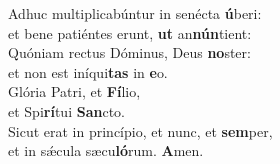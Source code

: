 \evenverse Adhuc multiplicabúntur in senécta \textbf{ú}beri:~\*\\
\evenverse et bene patiéntes erunt, \textbf{ut} an\textbf{nún}tient:\\
\oddverse Quóniam rectus Dóminus, Deus \textbf{no}ster:~\*\\
\oddverse et non est iníqui\textbf{tas} in \textbf{e}o.\\
\evenverse Glória Patri, et \textbf{Fí}lio,~\*\\
\evenverse et Spi\textbf{rí}tui \textbf{San}cto.\\
\oddverse Sicut erat in princípio, et nunc, et \textbf{sem}per,~\*\\
\oddverse et in sǽcula sæcu\textbf{ló}rum. \textbf{A}men.\\

